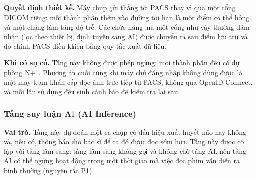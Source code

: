 \textbf{Quyết định thiết kế.} Máy chụp gửi thẳng tới PACS thay vì qua một cổng DICOM
riêng: mỗi thành phần thêm vào đường tới hạn là một điểm có thể hỏng và một chặng làm
tăng độ trễ. Các chức năng mà một cổng như vậy thường đảm nhận (lọc theo thiết bị, định
tuyến sang AI) được chuyển ra sau điểm lưu trữ và do chính PACS điều khiển bằng quy tắc
xuất dữ liệu.

\textbf{Khi có sự cố.} Tầng này không được phép ngừng; mọi thành phần đều có dự phòng
N+1. Phương án cuối cùng khi máy chủ đăng nhập không dùng được là một máy trạm khẩn cấp
đọc ảnh trực tiếp từ PACS, không qua OpenID Connect, và mỗi lần sử dụng đều sinh cảnh
báo để kiểm tra lại sau.

\subsubsection{Tầng suy luận AI (AI Inference)}

\textbf{Vai trò.} Tầng này dự đoán một ca chụp có dấu hiệu xuất huyết não hay không
và, nếu có, thông báo cho bác sĩ để ca đó được đọc sớm hơn. Tầng này được cô lập với
tầng lâm sàng: tầng lâm sàng không gọi và không chờ tầng AI, nên tầng AI có thể ngừng
hoạt động trong một thời gian mà việc đọc phim vẫn diễn ra bình thường (nguyên tắc
P1).


